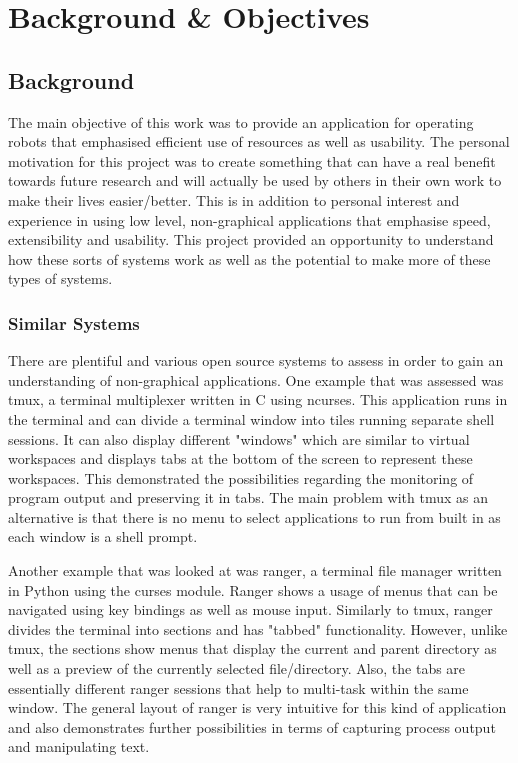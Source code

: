 \chapter{Background \& Objectives}

\section{Background}

The main objective of this work was to provide an application for operating robots that emphasised efficient use of resources as well as usability. The personal motivation for this project was to create something that can have a real benefit towards future research and will actually be used by others in their own work to make their lives easier/better. This is in addition to personal interest and experience in using low level, non-graphical applications that emphasise speed, extensibility and usability. This project provided an opportunity to understand how these sorts of systems work as well as the potential to make more of these types of systems.

\subsection{Similar Systems}
\label{similar}

There are plentiful and various open source systems to assess in order to gain an understanding of non-graphical applications. One example that was assessed was {\selectfont tmux}\cite{tmux}, a terminal multiplexer written in {\selectfont C} using {\selectfont ncurses}. This application runs in the terminal and can divide a terminal window into tiles running separate shell sessions. It can also display different "windows" which are similar to virtual workspaces and displays tabs at the bottom of the screen to represent these workspaces. This demonstrated the possibilities regarding the monitoring of program output and preserving it in tabs. The main problem with {\selectfont tmux} as an alternative is that there is no menu to select applications to run from built in as each window is a shell prompt.

Another example that was looked at was {\selectfont ranger}\cite{ranger}, a terminal file manager written in {\selectfont Python} using the {\selectfont curses} module. {\selectfont Ranger} shows a usage of menus that can be navigated using key bindings as well as mouse input. Similarly to {\selectfont tmux}, {\selectfont ranger} divides the terminal into sections and has "tabbed" functionality. However, unlike {\selectfont tmux}, the sections show menus that display the current and parent directory as well as a preview of the currently selected file/directory. Also, the tabs are essentially different {\selectfont ranger} sessions that help to multi-task within the same window. The general layout of {\selectfont ranger} is very intuitive for this kind of application and also demonstrates further possibilities in terms of capturing process output and manipulating text.

